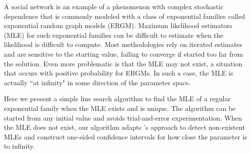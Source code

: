 A social network is an example of a phenomenon with complex stochastic dependence 
that is commonly modeled with a class of exponential families called exponential random graph models (ERGM).
Maximum likelihood estimators (MLE) for such  
exponential families
can be difficult to estimate when the likelihood is difficult to compute.
Most methodologies rely on iterated estimates and are sensitive
to the starting value, failing to converge if started too far from the
solution.  
Even more problematic is that the MLE may not exist, 
a situation that occurs with positive probability for ERGMs.
In such a case, the MLE 
is actually ``at infinity" in some direction of the parameter space.  

Here we present a simple line search algorithm to find the MLE of a regular exponential 
family when the MLE exists and is unique.  
The algorithm can be started from any 
initial value and avoids trial-and-error experimentation.  
When the MLE does not exist, our algorithm adapts
\citeauthor{Geyer:gdor}'s \citeyearpar{Geyer:gdor} approach
to detect non-existent MLEs and construct one-sided confidence intervals
for how close the parameter is to infinity.
